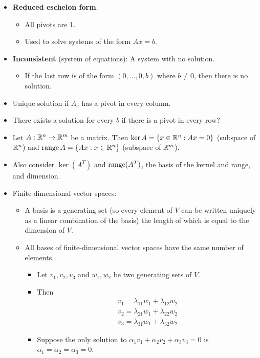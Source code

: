 \documentclass[../../notes.tex]{subfiles}
\begin{document}
\begin{itemize}
    \item \textbf{Reduced eschelon form}:
    \begin{itemize}
        \item All pivots are 1.
        \item Used to solve systems of the form $Ax=b$.
    \end{itemize}
    \item \textbf{Inconsistent} (system of equations): A system with no solution.
    \begin{itemize}
        \item If the last row is of the form $(0,\dots,0,b)$ where $b\neq 0$, then there is no solution.
    \end{itemize}
    \item Unique solution if $A_e$ has a pivot in every column.
    \item There exists a solution for every $b$ if there is a pivot in every row?
    \item Let $A:\mathbb{R}^n\to\mathbb{R}^m$ be a matrix. Then $\ker A=\{x\in\mathbb{R}^n:Ax=0\}$ (subspace of $\mathbb{R}^n$) and $\operatorname{range} A=\{Ax:x\in\mathbb{R}^n\}$ (subspace of $\mathbb{R}^m$).
    \item Also consider $\ker(A^T)$ and $\operatorname{range}(A^T)$, the basis of the kernel and range, and dimension.
    \item Finite-dimensional vector spaces:
    \begin{itemize}
        \item A basis is a generating set (so every element of $V$ can be written uniquely as a linear combination of the basis) the length of which is equal to the dimension of $V$.
        \item All bases of finite-dimensional vector spaces have the same number of elements.
        \begin{itemize}
            \item Let $v_1,v_2,v_3$ and $w_1,w_2$ be two generating sets of $V$.
            \item Then
            \begin{gather*}
                v_1 = \lambda_{11}w_1+\lambda_{12}w_2\\
                v_2 = \lambda_{21}w_1+\lambda_{22}w_2\\
                v_3 = \lambda_{31}w_1+\lambda_{32}w_2
            \end{gather*}
            \item Suppose the only solution to $\alpha_1v_1+\alpha_2v_2+\alpha_3v_3=0$ is $\alpha_1=\alpha_2=\alpha_3=0$.

\end{itemize}
\end{itemize}
\end{itemize}
\end{document}
